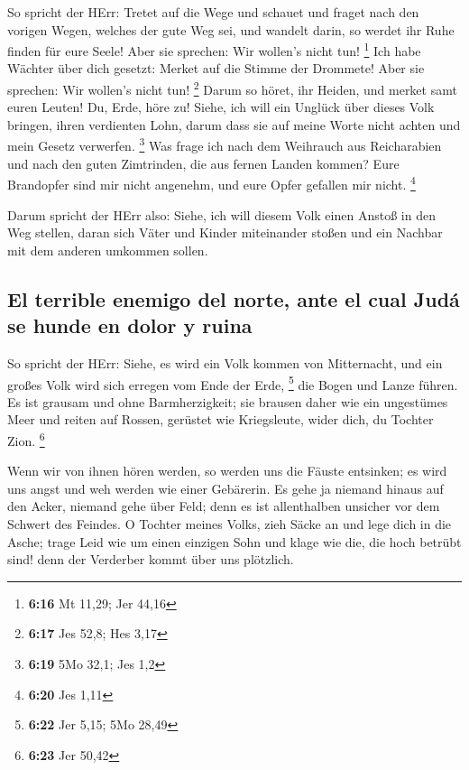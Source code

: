  So spricht der HErr: Tretet auf die Wege und schauet und
fraget nach den vorigen Wegen, welches der gute Weg sei, und wandelt
darin, so werdet ihr Ruhe finden für eure Seele! Aber sie sprechen: Wir
wollen's nicht tun! \footnote{\textbf{6:16} Mt 11,29; Jer 44,16}
 Ich habe Wächter über dich gesetzt: Merket auf die
Stimme der Drommete! Aber sie sprechen: Wir wollen's nicht tun!
\footnote{\textbf{6:17} Jes 52,8; Hes 3,17}  Darum so
höret, ihr Heiden, und merket samt euren Leuten!  Du,
Erde, höre zu! Siehe, ich will ein Unglück über dieses Volk bringen,
ihren verdienten Lohn, darum dass sie auf meine Worte nicht achten und
mein Gesetz verwerfen. \footnote{\textbf{6:19} 5Mo 32,1; Jes 1,2}
 Was frage ich nach dem Weihrauch aus Reicharabien und
nach den guten Zimtrinden, die aus fernen Landen kommen? Eure Brandopfer
sind mir nicht angenehm, und eure Opfer gefallen mir nicht. \footnote{\textbf{6:20}
  Jes 1,11}

 Darum spricht der HErr also: Siehe, ich will diesem Volk
einen Anstoß in den Weg stellen, daran sich Väter und Kinder miteinander
stoßen und ein Nachbar mit dem anderen umkommen sollen.

\hypertarget{el-terrible-enemigo-del-norte-ante-el-cual-juduxe1-se-hunde-en-dolor-y-ruina}{%
\subsection{El terrible enemigo del norte, ante el cual Judá se hunde en
dolor y
ruina}\label{el-terrible-enemigo-del-norte-ante-el-cual-juduxe1-se-hunde-en-dolor-y-ruina}}

 So spricht der HErr: Siehe, es wird ein Volk kommen von
Mitternacht, und ein großes Volk wird sich erregen vom Ende der Erde,
\footnote{\textbf{6:22} Jer 5,15; 5Mo 28,49}  die Bogen
und Lanze führen. Es ist grausam und ohne Barmherzigkeit; sie brausen
daher wie ein ungestümes Meer und reiten auf Rossen, gerüstet wie
Kriegsleute, wider dich, du Tochter Zion. \footnote{\textbf{6:23} Jer
  50,42}

 Wenn wir von ihnen hören werden, so werden uns die
Fäuste entsinken; es wird uns angst und weh werden wie einer Gebärerin.
 Es gehe ja niemand hinaus auf den Acker, niemand gehe
über Feld; denn es ist allenthalben unsicher vor dem Schwert des
Feindes.  O Tochter meines Volks, zieh Säcke an und lege
dich in die Asche; trage Leid wie um einen einzigen Sohn und klage wie
die, die hoch betrübt sind! denn der Verderber kommt über uns plötzlich.


